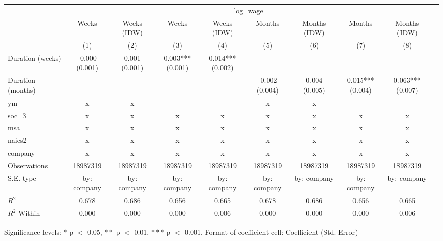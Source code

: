 \renewcommand\cellalign{t}
\begin{threeparttable}
\begin{tabular}{lccccccccc}
\toprule
 & \multicolumn{8}{c}{log_wage} \\
\cmidrule(lr){2-9} 
 & Weeks & Weeks (IDW) & Weeks & Weeks (IDW) & Months & Months (IDW) & Months & Months (IDW) \\
 & (1) & (2) & (3) & (4) & (5) & (6) & (7) & (8) \\
\midrule
\addlinespace
Duration (weeks) & \makecell{-0.000 \\ (0.001)} & \makecell{0.001 \\ (0.001)} & \makecell{0.003*** \\ (0.001)} & \makecell{0.014*** \\ (0.002)} &  &  &  &  \\
Duration (months) &  &  &  &  & \makecell{-0.002 \\ (0.004)} & \makecell{0.004 \\ (0.005)} & \makecell{0.015*** \\ (0.004)} & \makecell{0.063*** \\ (0.007)} \\
\midrule
\addlinespace
ym & x & x & - & - & x & x & - & - \\
soc_3 & x & x & x & x & x & x & x & x \\
msa & x & x & x & x & x & x & x & x \\
naics2 & x & x & x & x & x & x & x & x \\
company & x & x & x & x & x & x & x & x \\
\midrule
\addlinespace
Observations & 18987319 & 18987319 & 18987319 & 18987319 & 18987319 & 18987319 & 18987319 & 18987319 \\
S.E. type & by: company & by: company & by: company & by: company & by: company & by: company & by: company & by: company \\
$R^2$ & 0.678 & 0.686 & 0.656 & 0.665 & 0.678 & 0.686 & 0.656 & 0.665 \\
$R^2$ Within & 0.000 & 0.000 & 0.000 & 0.006 & 0.000 & 0.000 & 0.000 & 0.006 \\
\bottomrule
\end{tabular}
\footnotesize Significance levels: $*$ p $<$ 0.05, $**$ p $<$ 0.01, $***$ p $<$ 0.001. Format of coefficient cell: Coefficient 
 (Std. Error)
\end{threeparttable}